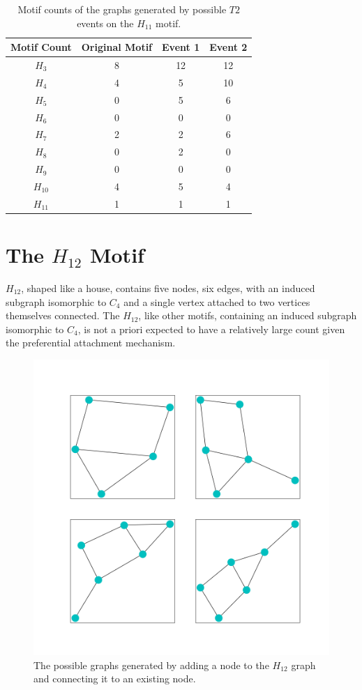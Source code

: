 \begin{table}
    \centering
    \begin{tabular}{||c c c c||} 
    \hline
    Motif Count & Original Motif & Event 1 & Event 2 \\ [0.5ex] 
    \hline\hline
    $H_{3}$ & 8 & 12 & 12 \\ 
    \hline
    $H_{4}$ & 4 & 5 & 10  \\
    \hline
    $H_{5}$ & 0 & 5 & 6  \\
    \hline
    $H_{6}$ & 0 & 0 & 0  \\
    \hline
    $H_{7}$ & 2 & 2 & 6 \\
    \hline
    $H_{8}$ & 0 & 2 & 0 \\
    \hline
    $H_{9}$ & 0 & 0 & 0 \\
    \hline
    $H_{10}$ & 4 & 5 & 4 \\
    \hline
    $H_{11}$ & 1 & 1 & 1\\
    \hline
   \end{tabular}
   \caption{Motif counts of the graphs generated by possible $T2$ events on the $H_{11}$ motif.}
   \label{table:9}
\end{table}

\FloatBarrier

\section{The \texorpdfstring{$H_{12}$}{H12} Motif}
$H_{12}$, shaped like a house, contains five nodes, six edges, with an induced subgraph isomorphic to $C_4$
and a single vertex attached to two vertices themselves connected. The $H_{12}$, like other
motifs, containing an induced subgraph isomorphic to $C_4$, is not a priori expected to have a relatively large count
given the preferential attachment mechanism. 

\begin{figure}[!ht]
    \includegraphics[width=12cm]{Images/H12_evolution.png}
    \centering
    \caption{The possible graphs generated by adding a node to the $H_{12}$ graph 
    and connecting it to an existing node.}
\end{figure}

